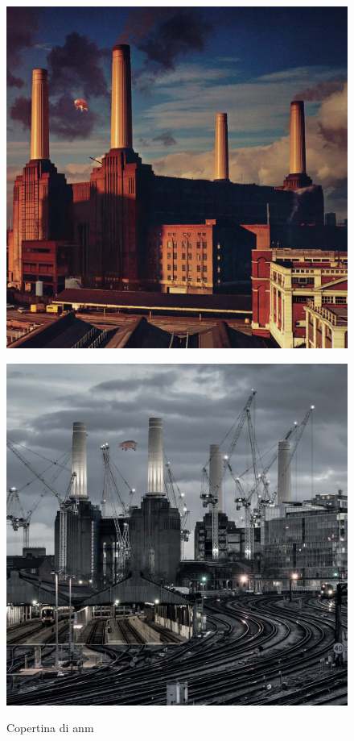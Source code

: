 \documentclass[class=book, crop=false, oneside, 12pt]{standalone}
\begin{document}
    \begin{figure}
    \begin{minipage}{.5\textwidth}
            \centering
            \includegraphics[keepaspectratio,width=.8\textwidth]{cover1977.jpeg}
            \label{fig:cover1977}
    \end{minipage}
    \begin{minipage}{.5\textwidth}
            \centering
            \includegraphics[keepaspectratio,width=.8\textwidth]{cover2018.jpeg}
            \label{fig:cover2018}
        \end{minipage}
        \caption{Copertina di \acrfull{anm}}
    \end{figure}
\end{document}
